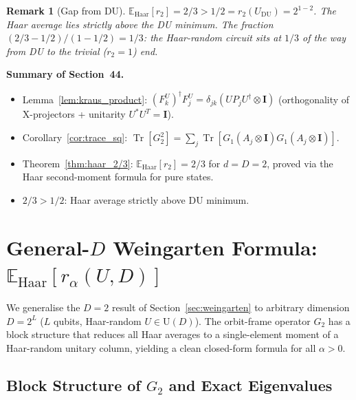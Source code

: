 \documentclass[12pt,a4paper]{article}
\newtheorem{remark}[theorem]{Remark}
\begin{document}
\begin{remark}[Gap from DU]
$\mathbb{E}_{\mathrm{Haar}}[r_2] = 2/3 > 1/2 = r_2(U_{\mathrm{DU}}) = 2^{1-2}$.
The Haar average lies strictly above the DU minimum.
The fraction $(2/3 - 1/2)/(1-1/2) = 1/3$: the Haar-random circuit sits at
$1/3$ of the way from DU to the trivial ($r_2=1$) end.
\end{remark}

\bigskip
\noindent\textbf{Summary of Section~44.}
\begin{itemize}
\item Lemma~\ref{lem:kraus_product}: $(F_k^U)^\dagger F_j^U = \delta_{jk}(U P_j U^\dagger\otimes\mathbf{I})$
  (orthogonality of X-projectors + unitarity $U^*U^T=\mathbf{I}$).
\item Corollary~\ref{cor:trace_sq}: $\operatorname{Tr}[G_2^2]=\sum_j\operatorname{Tr}[G_1(A_j\otimes\mathbf{I})G_1(A_j\otimes\mathbf{I})]$.
\item Theorem~\ref{thm:haar_2/3}: $\mathbb{E}_{\mathrm{Haar}}[r_2]=2/3$ for $d=D=2$,
  proved via the Haar second-moment formula for pure states.
\item $2/3 > 1/2$: Haar average strictly above DU minimum.
\end{itemize}

\section{General-$D$ Weingarten Formula: $\mathbb{E}_{\mathrm{Haar}}[r_\alpha(U,D)]$}
\label{sec:weingarten_general}

We generalise the $D=2$ result of Section~\ref{sec:weingarten} to arbitrary
dimension $D=2^L$ ($L$ qubits, Haar-random $U\in\mathrm{U}(D)$).
The orbit-frame operator $G_2$ has a block structure that reduces all Haar
averages to a single-element moment of a Haar-random unitary column,
yielding a clean closed-form formula for all $\alpha>0$.

\subsection{Block Structure of $G_2$ and Exact Eigenvalues}
\label{sec:g2_block}
\end{document}
